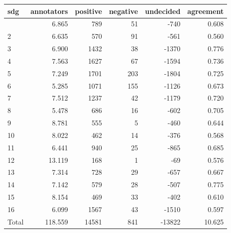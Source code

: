 \begin{table}[t]
\fontsize{12.0pt}{14.4pt}\selectfont
\begin{tabular*}{\linewidth}{@{\extracolsep{\fill}}lrrrrr}
\toprule
sdg & annotators & positive & negative & undecided & agreement \\ 
\midrule\addlinespace[2.5pt]
1 & 6.865 & 789 & 51 & -740 & 0.608 \\ 
2 & 6.635 & 570 & 91 & -561 & 0.560 \\ 
3 & 6.900 & 1432 & 38 & -1370 & 0.776 \\ 
4 & 7.563 & 1627 & 67 & -1594 & 0.736 \\ 
5 & 7.249 & 1701 & 203 & -1804 & 0.725 \\ 
6 & 5.285 & 1071 & 155 & -1126 & 0.673 \\ 
7 & 7.512 & 1237 & 42 & -1179 & 0.720 \\ 
8 & 5.478 & 686 & 16 & -602 & 0.705 \\ 
9 & 8.781 & 555 & 5 & -460 & 0.644 \\ 
10 & 8.022 & 462 & 14 & -376 & 0.568 \\ 
11 & 6.441 & 940 & 25 & -865 & 0.685 \\ 
12 & 13.119 & 168 & 1 & -69 & 0.576 \\ 
13 & 7.314 & 728 & 29 & -657 & 0.667 \\ 
14 & 7.142 & 579 & 28 & -507 & 0.775 \\ 
15 & 8.154 & 469 & 33 & -402 & 0.610 \\ 
16 & 6.099 & 1567 & 43 & -1510 & 0.597 \\ 
Total & 118.559 & 14581 & 841 & -13822 & 10.625 \\ 
\bottomrule
\end{tabular*}
\end{table}

